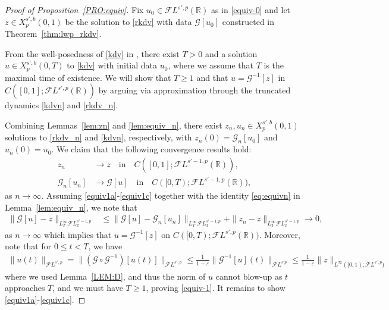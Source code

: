 \documentclass[a4paper,
11pt,  reqno]{amsart}
\newcommand{\5}{\textup{V}}
\newcommand{\FL}{\mathcal{F} L}
\newcommand{\eps}{\varepsilon}
\theoremstyle{remark}
\newcommand{\R}{\mathbb{R}}
\newcommand{\Gc}{\mathcal{G}}
\numberwithin{equation}{section}
\numberwithin{theorem}{section}
\begin{document}
\begin{proof}[Proof of Proposition~\ref{PRO:equiv}]

Fix $u_0 \in \FL^{s',p}(\R)$ as in \eqref{equiv-0} and let $z \in X^{s',b}_p(0,1)$ be the solution to \eqref{rkdv} with data $\Gc[u_0]$ constructed in Theorem~\ref{thm:lwp_rkdv}.


From the well-posedness of \eqref{kdv} in \cite{Grunrock_ldv_hier}, there exist $T>0$ and a solution $u \in X^{s',b}_p(0,T)$ to \eqref{kdv} with initial data $u_0$, where we assume that $T$ is the maximal time of existence.
We will show that $T\ge 1$ and that $u = \Gc^{-1} [z]$ in $C([0,1]; \FL^{s',p}(\R))$ by arguing via approximation through the truncated dynamics \eqref{kdvn} and \eqref{rkdv_n}.


Combining Lemmas~\ref{lem:zn} and \ref{lem:equiv_n}, there exist $z_n, u_n \in X^{s',b}_p(0,1)$ solutions to \eqref{rkdv_n} and \eqref{kdvn}, respectively, with $z_n (0) = \Gc_n[u_0] $ and $u_n(0) = u_0$.
We claim that the following convergence results hold:
\begin{align}
\label{equiv1a}
z_n & \to z \quad \text{in} \quad  C([0,1]; \FL^{s'-1,p}(\R))
,
\\
\label{equiv1c}
\Gc_n [u_n] & \to  \Gc[u]   \quad \text{in} \quad  C([0,T); \FL^{s'-1,p}(\R)),
\end{align}
as $n\to\infty$.
Assuming \eqref{equiv1a}-\eqref{equiv1c} together with the identity \eqref{eq:equivn} in Lemma~\ref{lem:equiv_n}, we note that
\begin{align}
\| \Gc[u] - z\|_{L^\infty_T \FL^{s'-1,p}_x}
&
 \le
\| \Gc[u] - \Gc_n[u_n] \|_{L^\infty_T \FL^{s'-1,p}_x}
+
\| z_n - z \|_{L^\infty_T \FL^{s'-1,p}_x} \to 0,
\end{align}
as $n\to \infty$
which implies that
$u = \Gc^{-1}[z]$ on $C([0,T); \FL^{s',p}(\R))$.
Moreover, note that for $0\le t < T$, we have
\begin{align}
\| u (t) \|_{\FL^{s',p}}  = \|( \Gc \circ \Gc^{-1}) [u(t)] \|_{\FL^{s',p}} \le \tfrac{1}{1-\eps} \| \Gc^{-1}[u](t) \|_{\FL^{s'p}} \le \tfrac{1}{1-\eps} \|z\|_{L^\infty([0,1); \FL^{s',p})}
\end{align}
where we used Lemma~\ref{LEM:D}, and thus the norm of $u$ cannot blow-up as $t$ approaches $T$, and we must have $T \ge 1$, proving \eqref{equiv-1}.
%
It remains to show \eqref{equiv1a}-\eqref{equiv1c}.



\smallskip


\end{proof}
\end{document}
